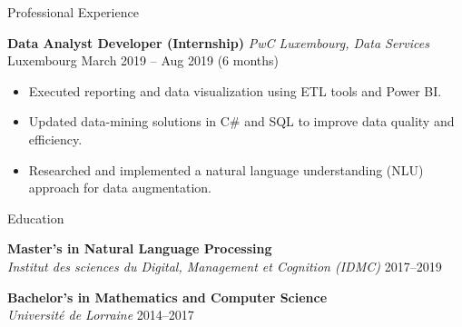\documentclass{resume} %
\begin{document}
\begin{rSection}{Professional Experience}
\vspace{0.1cm}

\textbf{Data Analyst Developer (Internship)} \hfill \textit{PwC Luxembourg, Data Services} \\
Luxembourg \hfill March 2019 -- Aug 2019 (6 months)
\begin{itemize}
    \item Executed reporting and data visualization using ETL tools and Power BI.
    \item Updated data-mining solutions in C\# and SQL to improve data quality and efficiency.
    \item Researched and implemented a natural language understanding (NLU) approach for data augmentation.
\end{itemize}

\end{rSection}

\begin{rSection}{Education}

\textbf{Master's in Natural Language Processing} \\
\textit{Institut des sciences du Digital, Management et Cognition (IDMC)} \hfill 2017--2019

\textbf{Bachelor's in Mathematics and Computer Science} \\
\textit{Université de Lorraine} \hfill 2014--2017 \\
\end{rSection}
\end{document}
